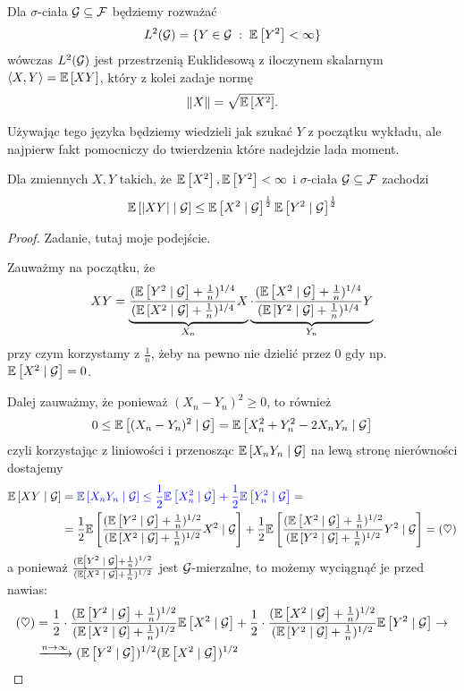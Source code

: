 Dla $\sigma$-ciała $\mathcal{G}\subseteq\mathcal{F}$ będziemy rozważać
$$L^2(\set{G})=\{Y\in\set{G}\;:\;\expected{Y^2}<\infty\}$$
wówczas $L^2(\mathcal{G})$ jest przestrzenią Euklidesową z iloczynem skalarnym $\langle X, Y\rangle=\expected{XY}$, który z kolei zadaje normę
$$\|X\|=\sqrt{\expected{X^2}}.$$

Używając tego języka będziemy wiedzieli jak szukać $Y$ z początku wykładu, ale najpierw fakt pomocniczy do twierdzenia które nadejdzie lada moment.

\begin{fact}\label{warunkowy Cauchy-szwarc}
  Dla zmiennych  $X,Y$ takich, że $\expected{X^2},\expected{Y^2}<\infty$ i $\sigma$-ciała $\mathcal{G}\subseteq\mathcal{F}$ zachodzi
  $$\expected{|XY|}{\set{G}}\leq\expected{X^2}{\set{G}}^{\frac{1}{2}}\expected{Y^2}{\set{G}}^{\frac{1}{2}}$$
\end{fact}

\begin{proof}
  Zadanie, tutaj moje podejście.


  Zauważmy na początku, że
  $$XY=\underbrace{\frac{(\expected{Y^2}{\set{G}}+\frac{1}{n})^{1/4}}{(\expected{X^2}{\set{G}}+\frac{1}{n})^{1/4}}X}_{X_n}\underbrace{\cdot\frac{(\expected{X^2}{\set{G}}+\frac{1}{n})^{1/4}}{(\expected{Y^2}{\set{G}}+\frac{1}{n})^{1/4}}Y}_{Y_n}$$
  przy czym korzystamy z $\frac{1}{n}$, żeby na pewno nie dzielić przez $0$ gdy np. $\expected{X^2}{\set{G}}=0$.

  Dalej zauważmy, że ponieważ $(X_n-Y_n)^2\geq0$, to również
  $$0\leq\expected{(X_n-Y_n)^2}{\set{G}}=\expected{X_n^2+Y_n^2-2X_nY_n}{\set{G}}$$
  czyli korzystając z liniowości i przenosząc $\expected{X_nY_n}{\set{G}}$ na lewą stronę nierówności dostajemy
  \begin{align*}\expected{XY}{\set{G}}&={\color{blue}
    \expected{X_nY_n}{\set{G}}\leq 
  \frac{1}{2}\expected{X_n^2}{\set{G}}+\frac{1}{2}\expected{Y_n^2}{\set{G}}}=\\ 
  &=\frac{1}{2}\expected{\frac{(\expected{Y^2}{\set{G}}+\frac{1}{n})^{1/2}}{(\expected{X^2}{\set{G}}+\frac{1}{n})^{1/2}}X^2}{\set{G}}+\frac{1}{2}\expected{\frac{(\expected{X^2}{\set{G}}+\frac{1}{n})^{1/2}}{(\expected{Y^2}{\set{G}}+\frac{1}{n})^{1/2}}Y^2}{\set{G}}=(\heartsuit)
  \end{align*}
  a ponieważ $\frac{(\expected{Y^2}{\set{G}}+\frac{1}{n})^{1/2}}{(\expected{X^2}{\set{G}}+\frac{1}{n})^{1/2}}$ jest $\mathcal{G}$-mierzalne, to możemy wyciągnąć je przed nawias:
  \begin{align*}
    (\heartsuit)&=\frac{1}{2}\cdot \frac{ (\expected{Y^2}{\set{G}}+\frac{1}{n})^{1/2}}{ (\expected{X^2}{\set{G}}+\frac{1}{n})^{1/2}} \expected{X^2}{\set{G}}+\frac{1}{2}\cdot  \frac{ (\expected{X^2}{\set{G}}+\frac{1}{n})^{1/2}}{ (\expected{Y^2}{\set{G}}+\frac{1}{n})^{1/2}} \expected{Y^2}{\set{G}}\to\\ 
                &\xrightarrow{n\to\infty}(\expected{Y^2}{\set{G}})^{1/2}(\expected{X^2}{\set{G}})^{1/2}
  \end{align*}
\end{proof}

